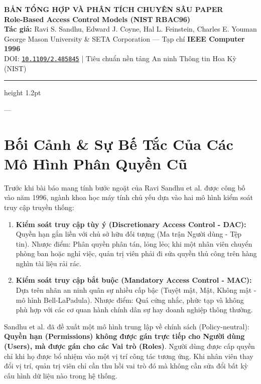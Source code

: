 \documentclass[11pt,a4paper]{article}
\begin{document}
\begin{center}
    {\Large\bfseries BẢN TỔNG HỢP VÀ PHÂN TÍCH CHUYÊN SÂU PAPER}\\[0.3cm]
    {\LARGE\bfseries Role-Based Access Control Models (NIST RBAC96)}\\[0.4cm]
    {\normalsize\textbf{Tác giả:} Ravi S. Sandhu, Edward J. Coyne, Hal L. Feinstein, Charles E. Youman}\\[0.15cm]
    {\small George Mason University \& SETA Corporation — Tạp chí \textbf{IEEE Computer 1996}}\\[0.15cm]
    {\small DOI: \href{https://doi.org/10.1109/2.485845}{\texttt{10.1109/2.485845}} \quad | \quad Tiêu chuẩn nền tảng An ninh Thông tin Hoa Kỳ (NIST)}
\end{center}

\vspace{0.3cm}
\hrule height 1.2pt
\vspace{0.6cm}

---

\section{Bối Cảnh \& Sự Bế Tắc Của Các Mô Hình Phân Quyền Cũ}

Trước khi bài báo mang tính bước ngoặt của Ravi Sandhu et al. được công bố vào năm 1996, ngành khoa học máy tính chủ yếu dựa vào hai mô hình kiểm soát truy cập truyền thống:
\begin{enumerate}[leftmargin=1.8em]
    \item \textbf{Kiểm soát truy cập tùy ý (Discretionary Access Control - DAC):} Quyền hạn gắn liền với chủ sở hữu đối tượng (Ma trận Người dùng - Tệp tin). Nhược điểm: Phân quyền phân tán, lỏng lẻo; khi một nhân viên chuyển phòng ban hoặc nghỉ việc, quản trị viên phải đi sửa quyền thủ công trên hàng nghìn tài liệu rải rác.
    \item \textbf{Kiểm soát truy cập bắt buộc (Mandatory Access Control - MAC):} Dựa trên nhãn an ninh quân sự nhiều cấp bậc (Tuyệt mật, Mật, Không mật - mô hình Bell-LaPadula). Nhược điểm: Quá cứng nhắc, phức tạp và không phù hợp với các cơ quan hành chính dân sự hay doanh nghiệp thông thường.
\end{enumerate}

\begin{coreconceptbox}
Sandhu et al. đã đề xuất một mô hình trung lập về chính sách (Policy-neutral): \textbf{Quyền hạn (Permissions) không được gán trực tiếp cho Người dùng (Users), mà được gán cho các Vai trò (Roles)}. Người dùng được cấp quyền chỉ khi họ được bổ nhiệm vào một vị trí công tác tương ứng. Khi nhân viên thay đổi vị trí, quản trị viên chỉ cần thu hồi vai trò đó mà không cần sửa đổi bất kỳ cấu hình dữ liệu nào trong hệ thống.
\end{coreconceptbox}
\end{document}
